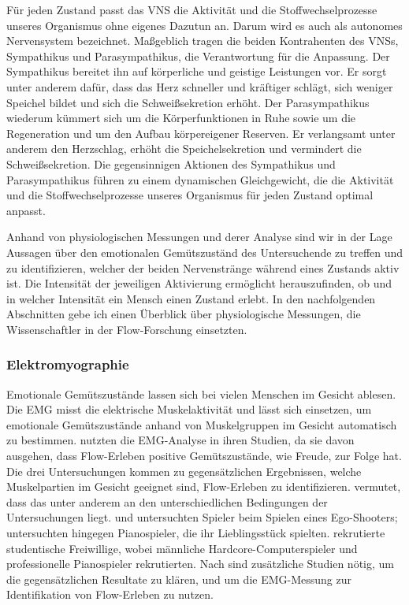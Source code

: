 Für jeden Zustand passt das \acs{VNS} die Aktivität und die Stoffwechselprozesse unseres Organismus ohne eigenes Dazutun an. Darum wird es auch als autonomes Nervensystem bezeichnet. Maßgeblich tragen die beiden Kontrahenten des \acs{VNS}s, Sympathikus und Parasympathikus, die Verantwortung für die Anpassung. Der Sympathikus bereitet ihn auf körperliche und geistige Leistungen vor. Er sorgt unter anderem dafür, dass das Herz schneller und kräftiger schlägt, sich weniger Speichel bildet und sich die Schweißsekretion erhöht. Der Parasympathikus wiederum kümmert sich um die Körperfunktionen in Ruhe sowie um die Regeneration und um den Aufbau körpereigener Reserven. Er verlangsamt unter anderem den Herzschlag, erhöht die Speichelsekretion und vermindert die Schweißsekretion. Die gegensinnigen Aktionen des Sympathikus und Parasympathikus führen zu einem dynamischen Gleichgewicht, die die Aktivität und die Stoffwechselprozesse unseres Organismus für jeden Zustand optimal anpasst. 

Anhand von physiologischen Messungen und derer Analyse sind wir in der Lage Aussagen über den emotionalen Gemütszuständ des Untersuchende zu treffen und zu identifizieren, welcher der beiden Nervenstränge während eines Zustands aktiv ist. Die Intensität der jeweiligen Aktivierung ermöglicht herauszufinden, ob und in welcher Intensität ein Mensch einen Zustand erlebt. In den nachfolgenden Abschnitten gebe ich einen Überblick über physiologische Messungen, die Wissenschaftler in der Flow-Forschung einsetzten.

\subsubsection{Elektromyographie} 

\label{ssub:elektromyographie}

Emotionale Gemütszustände lassen sich bei vielen Menschen im Gesicht ablesen. Die \ac{EMG} misst die elektrische Muskelaktivität und lässt sich einsetzen, um emotionale Gemütszustände anhand von Muskelgruppen im Gesicht automatisch zu bestimmen. \citet{Kivikangas2006, Nacke2008, deManzano2010} nutzten die \ac{EMG}-Analyse in ihren Studien, da sie davon ausgehen, dass Flow-Erleben positive Gemütszustände, wie Freude, zur Folge hat. Die drei Untersuchungen kommen zu gegensätzlichen Ergebnissen, welche Muskelpartien im Gesicht geeignet sind, Flow-Erleben zu identifizieren. \citet[][S.~153]{Peifer2012} vermutet, dass das unter anderem an den unterschiedlichen Bedingungen der Untersuchungen liegt. \citet{Kivikangas2006} und \citet{Nacke2008} untersuchten Spieler beim Spielen eines Ego-Shooters; \citet{deManzano2010} untersuchten hingegen Pianospieler, die ihr Lieblingsstück spielten. \citet{Kivikangas2006} rekrutierte studentische Freiwillige, wobei \citet{Nacke2008} männliche Hardcore-Computerspieler und \citet{deManzano2010} professionelle Pianospieler rekrutierten. Nach \citet[][S.~153]{Peifer2012} sind zusätzliche Studien nötig, um die gegensätzlichen Resultate zu klären, und um die \ac{EMG}-Messung zur Identifikation von Flow-Erleben zu nutzen.


